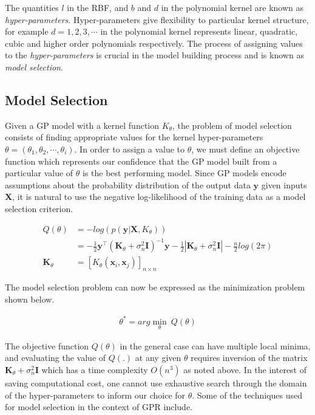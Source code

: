 \documentclass[sw, draft]{AGUTeX}
\begin{document}
\begin{article}
The quantities $l$ in the RBF, and $b$ and $d$ in the polynomial kernel are known as \emph{hyper-parameters}. Hyper-parameters give flexibility to particular kernel structure, for example $d = 1, 2, 3, \cdots$ in the polynomial kernel represents linear, quadratic, cubic and higher order polynomials respectively. The process of assigning values to the \emph{hyper-parameters} is crucial in the model building process and is known as \emph{model selection}. 

\subsection{Model Selection}

Given a GP model with a kernel function $K_\theta$, the problem of model selection consists of finding appropriate values for the kernel hyper-parameters $\theta = \left(\theta_1, \theta_2, \cdots, \theta_i\right)$. In order to assign a value to $\theta$, we must define an objective function which represents our confidence that the GP model built from a particular value of $\theta$ is the best performing model. Since GP models encode assumptions about the probability distribution of the output data $\mathbf{y}$ given inputs $\mathbf{X}$, it is natural to use the negative log-likelihood of the training data as a model selection criterion. 

\begin{align*}
  Q(\theta) & = - log(p(\mathbf{y}|\mathbf{X}, K_\theta)) \\
            & = -\frac{1}{2} \mathbf{y}^\intercal (\mathbf{K}_\theta + \sigma^{2}_n \mathbf{I})^{-1} \mathbf{y} - \frac{1}{2}|\mathbf{K}_\theta + \sigma^{2}_n \mathbf{I}| - \frac{n}{2}log(2\pi) \\
  \mathbf{K}_\theta & = [K_{\theta}(\mathbf{x}_i, \mathbf{x}_j)]_{n \times n}
\end{align*}

The model selection problem can now be expressed as the minimization problem shown below.

\begin{align*}
\theta^* = arg\min_{\theta} \ Q(\theta)
\end{align*}

The objective function $Q(\theta)$ in the general case can have multiple local minima, and evaluating the value of $Q(.)$ at any given $\theta$ requires inversion of the matrix $\mathbf{K}_\theta + \sigma^{2}_n \mathbf{I}$ which has a time complexity $O(n^3)$ as noted above. In the interest of saving computational cost, one cannot use exhaustive search through the domain of the hyper-parameters to inform our choice for $\theta$. Some of the techniques used for model selection in the context of GPR include.


\end{article}
\end{document}
